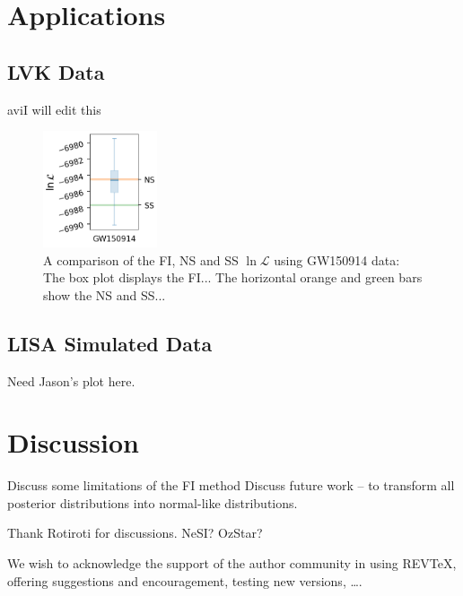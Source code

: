 \documentclass[%
 reprint,
 amsmath,amssymb,
 aps,
]{revtex4-2}
\begin{document}
\section{Applications}\label{sec:applications}
\subsection{LVK Data}\label{subsec:LVK}

avi{I will edit this}


\begin{figure}[h]
\caption{A comparison of the FI, NS and SS $\ln \mathcal{L}$ using GW150914 data: The box plot displays the FI... The horizontal orange and green bars show the NS and SS... }
\centering
\includegraphics[width=0.3\textwidth]{figures/GW150914.png}
\end{figure}

\subsection{LISA Simulated Data}\label{subsec:LISA}
Need Jason's plot here.



\section{\label{sec:discussion} Discussion}
Discuss some limitations of the FI method
Discuss future work -- to transform all posterior distributions into normal-like distributions.



\begin{acknowledgments}
Thank Rotiroti for discussions. NeSI? OzStar?

We wish to acknowledge the support of the author community in using
REV\TeX{}, offering suggestions and encouragement, testing new versions,
\dots.
\end{acknowledgments}


\end{document}
